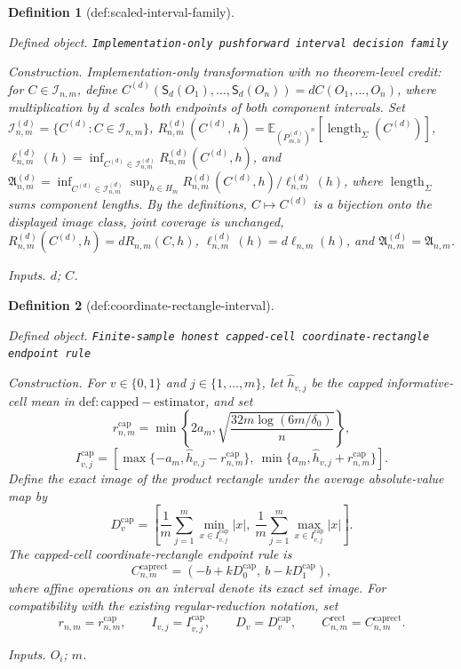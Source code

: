 \documentclass{article}
\newtheorem{definition}{Definition}
\begin{document}
\begin{definition}[def:scaled-interval-family]\label{def:scaled-interval-family}
\par\smallskip\noindent\emph{Defined object.} \texttt{Implementation-\allowbreak{}only pushforward interval decision family}
\par\smallskip\noindent\emph{Construction.} Implementation-only transformation with no theorem-level credit: for \(C\in\mathcal I_{n,m}\), define \(C^{(d)}(\mathsf S_d(O_1),\ldots,\mathsf S_d(O_n))=dC(O_1,\ldots,O_n)\), where multiplication by \(d\) scales both endpoints of both component intervals. Set \(\mathcal I^{(d)}_{n,m}=\{C^{(d)}:C\in\mathcal I_{n,m}\}\), \(R^{(d)}_{n,m}(C^{(d)},h)=\mathbb E_{(P^{(d)}_{m,h})^n}[\operatorname{length}_{\Sigma}(C^{(d)})]\), \(\ell^{(d)}_{n,m}(h)=\inf_{C^{(d)}\in\mathcal I^{(d)}_{n,m}}R^{(d)}_{n,m}(C^{(d)},h)\), and \(\mathfrak A^{(d)}_{n,m}=\inf_{C^{(d)}\in\mathcal I^{(d)}_{n,m}}\sup_{h\in H_m}R^{(d)}_{n,m}(C^{(d)},h)/\ell^{(d)}_{n,m}(h)\), where \(\operatorname{length}_{\Sigma}\) sums component lengths. By the definitions, \(C\mapsto C^{(d)}\) is a bijection onto the displayed image class, joint coverage is unchanged, \(R^{(d)}_{n,m}(C^{(d)},h)=dR_{n,m}(C,h)\), \(\ell^{(d)}_{n,m}(h)=d\ell_{n,m}(h)\), and \(\mathfrak A^{(d)}_{n,m}=\mathfrak A_{n,m}\).
\par\smallskip\noindent\emph{Inputs.} \(d\); \(C\).
\end{definition}

\begin{definition}[def:coordinate-rectangle-interval]\label{def:coordinate-rectangle-interval}
\par\smallskip\noindent\emph{Defined object.} \texttt{Finite-\allowbreak{}sample honest capped-\allowbreak{}cell coordinate-\allowbreak{}rectangle endpoint rule}
\par\smallskip\noindent\emph{Construction.} For \(v\in\{0,1\}\) and \(j\in\{1,\ldots,m\}\), let \(\widehat h_{v,j}\) be the capped informative-cell mean in \(\mathrm{def:capped-estimator}\), and set
\[
 r^{\mathrm{cap}}_{n,m}
 =\min\left\{2a_m,\sqrt{\frac{32m\log(6m/\delta_0)}{n}}\right\},
\]
\[
 I^{\mathrm{cap}}_{v,j}
 =\left[
 \max\{-a_m,\widehat h_{v,j}-r^{\mathrm{cap}}_{n,m}\},
 \ \min\{a_m,\widehat h_{v,j}+r^{\mathrm{cap}}_{n,m}\}
 \right].
\]
Define the exact image of the product rectangle under the average absolute-value map by
\[
 D^{\mathrm{cap}}_v
 =\left[
 \frac1m\sum_{j=1}^{m}\min_{x\in I^{\mathrm{cap}}_{v,j}}|x|,
 \ \frac1m\sum_{j=1}^{m}\max_{x\in I^{\mathrm{cap}}_{v,j}}|x|
 \right].
\]
The capped-cell coordinate-rectangle endpoint rule is
\[
 C^{\mathrm{caprect}}_{n,m}
 =\left(-b+kD^{\mathrm{cap}}_0,\ b-kD^{\mathrm{cap}}_1\right),
\]
where affine operations on an interval denote its exact set image. For compatibility with the existing regular-reduction notation, set
\[
 r_{n,m}=r^{\mathrm{cap}}_{n,m},\qquad
 I_{v,j}=I^{\mathrm{cap}}_{v,j},\qquad
 D_v=D^{\mathrm{cap}}_v,\qquad
 C^{\mathrm{rect}}_{n,m}=C^{\mathrm{caprect}}_{n,m}.
\]
\par\smallskip\noindent\emph{Inputs.} \(O_i\); \(m\).
\end{definition}
\end{document}

